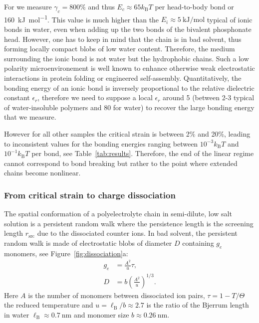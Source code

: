 \documentclass[journal=jacsat,manuscript=article]{achemso}
\begin{document}
For  we measure $\gamma_c = 800\%$ and thus $E_c \approx 65 k_\mathrm{B}T$ per head-to-body bond or \SI{160}{\kilo\joule\per\mol}. This value is much higher than the $E_i\approx\SI{5}{\kilo\joule\per\mol}$ typical of ionic bonds in water\cite{Schneider1992}, even when adding up the two bonds of the bivalent phosphonate head. However, one has to keep in mind that the chain is in bad solvent, thus forming locally compact blobs of low water content. Therefore, the medium surrounding the ionic bond is not water but the hydrophobic chains. Such a low polarity microenvironement is well known to enhance otherwise weak electrostatic interactions in protein folding or engineered self-assembly\cite{Rehm2010}. Quantitatively, the bonding energy of an ionic bond is inversely proportional to the relative dielectric constant $\epsilon_r$, therefore we need to suppose a local $\epsilon_r$ around 5 (between 2-3 typical of water-insoluble polymers and 80 for water) to recover the large bonding energy that we measure.

However for all other samples the critical strain is between 2\% and 20\%, leading to inconsistent values for the bonding energies ranging between $10^{-3}k_\mathrm{B}T$ and $10^{-1}k_\mathrm{B}T$ per bond, see Table~\ref{tab:results}. Therefore, the end of the linear regime cannot correspond to bond breaking but rather to the point where extended chains become nonlinear.


\subsubsection{From critical strain to charge dissociation}

The spatial conformation of a polyelectrolyte chain in semi-dilute, low salt solution is a persistent random walk where the persistence length is the screening length $r_\mathrm{src}$ due to the dissociated counter ions\cite{Rubinstein1996}. In bad solvent, the persistent random walk is made of electrostatic blobs of diameter $D$ containing $g_e$ monomers, see Figure~\ref{fig:dissociation}a:
\begin{align}
g_e &= \frac{A^2}{u}\tau\label{eq:ge},\\
D &= b \left(\frac{A^2}{u}\right)^{1/3}\label{eq:D}.
\end{align}
Here $A$ is the number of monomers between dissociated ion pairs, $\tau = 1 - T/\Theta$ the reduced temperature and $u = \ell_\mathrm{B}/b \approx 2.7$ is the ratio of the Bjerrum length in water $\ell_\mathrm{B}\approx \SI{0.7}{\nano\metre}$ and monomer size $b\approx \SI{0.26}{\nano\metre}$. 
\end{document}
